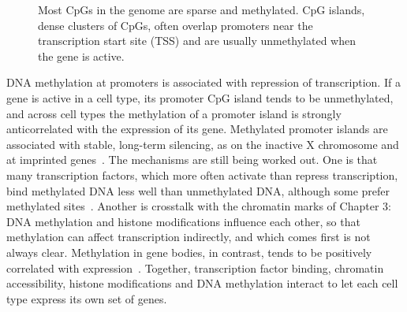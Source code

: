 \begin{figure}[t]
  \centering
  \caption{Most CpGs in the genome are sparse and methylated. CpG islands, dense clusters of CpGs, often overlap promoters near the transcription start site (TSS) and are usually unmethylated when the gene is active.}
  \label{fig:cpg_island}
\end{figure}

DNA methylation at promoters is associated with repression of transcription. If a gene is active in a cell type, its promoter CpG island tends to be unmethylated, and across cell types the methylation of a promoter island is strongly anticorrelated with the expression of its gene. Methylated promoter islands are associated with stable, long-term silencing, as on the inactive X chromosome and at imprinted genes~\citep{deaton2011,jones2012}. The mechanisms are still being worked out. One is that many transcription factors, which more often activate than repress transcription, bind methylated DNA less well than unmethylated DNA, although some prefer methylated sites~\citep{yin2017}. Another is crosstalk with the chromatin marks of Chapter 3: DNA methylation and histone modifications influence each other, so that methylation can affect transcription indirectly, and which comes first is not always clear. Methylation in gene bodies, in contrast, tends to be positively correlated with expression~\citep{jones2012}. Together, transcription factor binding, chromatin accessibility, histone modifications and DNA methylation interact to let each cell type express its own set of genes.

